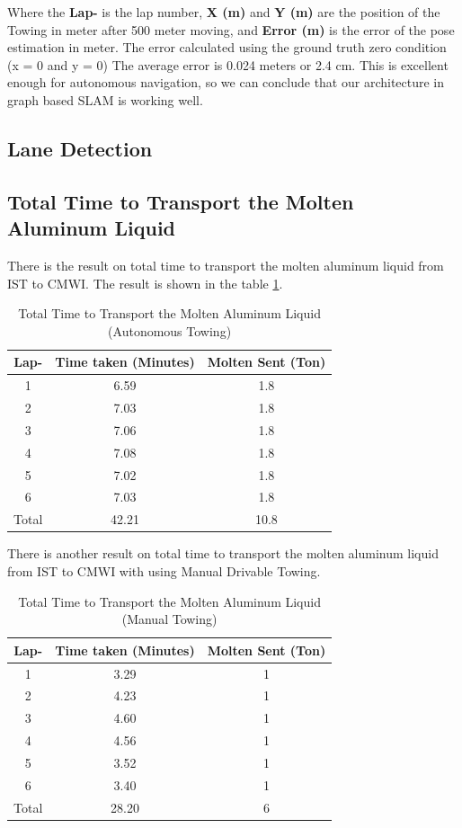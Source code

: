 \documentclass[conference]{IEEEtran}
\begin{document}
Where the \textbf{Lap-} is the lap number, \textbf{X (m)} and \textbf{Y (m)} are the position of the Towing in meter after 500 meter moving, and \textbf{Error (m)} is the error of the pose estimation in meter. The error calculated using the ground truth zero condition (x = 0 and y = 0) The average error is 0.024 meters or 2.4 cm. This is excellent enough for autonomous navigation, so we can conclude that our architecture in graph based SLAM is working well.

\subsection{Lane Detection}
\subsection{Total Time to Transport the Molten Aluminum Liquid}
There is the result on total time to transport the molten aluminum liquid from IST to CMWI. The result is shown in the table \ref{tab:total_time_transport}.
\begin{table}[H]
	\centering
	\caption{Total Time to Transport the Molten Aluminum Liquid (Autonomous Towing)}
	\label{tab:total_time_transport}
	\begin{tabular}{|c|c|c|}
		\hline
		\textbf{Lap-} & \textbf{Time taken (Minutes)} & \textbf{Molten Sent (Ton)} \\ \hline
		1 & 6.59 & 1.8 \\ \hline
		2 & 7.03 & 1.8 \\ \hline
		3 & 7.06 & 1.8 \\ \hline
		4 & 7.08 & 1.8 \\ \hline
		5 & 7.02 & 1.8 \\ \hline
		6 & 7.03 & 1.8 \\ \hline
		Total & 42.21 & 10.8 \\ \hline
	\end{tabular}
\end{table} 

There is another result on total time to transport the molten aluminum liquid from IST to CMWI with using Manual Drivable Towing. 

\begin{table}[H]
	\centering
	\caption{Total Time to Transport the Molten Aluminum Liquid (Manual Towing)}
	\label{tab:total_time_transport_manual}
	\begin{tabular}{|c|c|c|}
		\hline
		\textbf{Lap-} & \textbf{Time taken (Minutes)} & \textbf{Molten Sent (Ton)} \\ \hline
		1 & 3.29 & 1 \\ \hline
		2 & 4.23 & 1 \\ \hline
		3 & 4.60 & 1 \\ \hline
		4 & 4.56 & 1 \\ \hline
		5 & 3.52 & 1 \\ \hline
		6 & 3.40 & 1 \\ \hline
		Total & 28.20 & 6 \\ \hline
	\end{tabular}
\end{table} 
\end{document}
